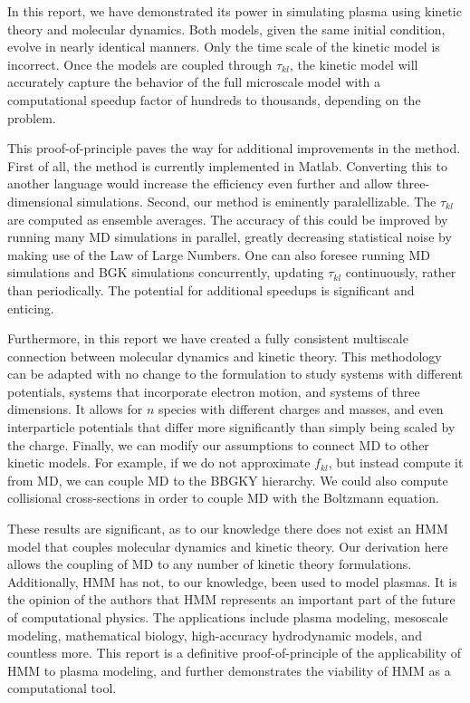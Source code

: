 \documentclass{article}
\begin{document}
In this report, we have demonstrated its power in simulating plasma using kinetic theory and molecular dynamics. Both models, given the same initial condition, evolve in nearly identical manners. Only the time scale of the kinetic model is incorrect. Once the models are coupled through $\tau_{kl}$, the kinetic model will accurately capture the behavior of the full microscale model with a computational speedup factor of hundreds to thousands, depending on the problem.

This proof-of-principle paves the way for additional improvements in the method. First of all, the method is currently implemented in Matlab. Converting this to another language would increase the efficiency even further and allow three-dimensional simulations. Second, our method is eminently paralellizable. The $\tau_{kl}$ are computed as ensemble averages. The accuracy of this could be improved by running many MD simulations in parallel, greatly decreasing statistical noise by making use of the Law of Large Numbers. One can also foresee running MD simulations and BGK simulations concurrently, updating $\tau_{kl}$ continuously, rather than periodically. The potential for additional speedups is significant and enticing.

Furthermore, in this report we have created a fully consistent multiscale connection between molecular dynamics and kinetic theory. This methodology can be adapted with no change to the formulation to study systems with different potentials, systems that incorporate electron motion, and systems of three dimensions. It allows for $n$ species with different charges and masses, and even interparticle potentials that differ more significantly than simply being scaled by the charge. Finally, we can modify our assumptions to connect MD to other kinetic models. For example, if we do not approximate $f_{kl}$, but instead compute it from MD, we can couple MD to the BBGKY hierarchy. We could also compute collisional cross-sections in order to couple MD with the Boltzmann equation.

These results are significant, as to our knowledge there does not exist an HMM model that couples molecular dynamics and kinetic theory. Our derivation here allows the coupling of MD to any number of kinetic theory formulations. Additionally, HMM has not, to our knowledge, been used to model plasmas. It is the opinion of the authors that HMM represents an important part of the future of computational physics. The applications include plasma modeling, mesoscale modeling, mathematical biology, high-accuracy hydrodynamic models, and countless more. This report is a definitive proof-of-principle of the applicability of HMM to plasma modeling, and further demonstrates the viability of HMM as a computational tool.
\end{document}
